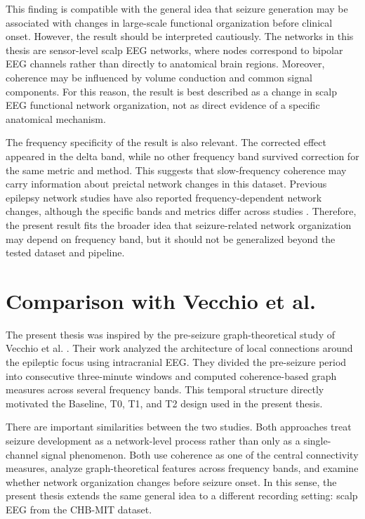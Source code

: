 This finding is compatible with the general idea that seizure generation may be
associated with changes in large-scale functional organization before clinical
onset. However, the result should be interpreted cautiously. The networks in
this thesis are sensor-level scalp EEG networks, where nodes correspond to
bipolar EEG channels rather than directly to anatomical brain regions. Moreover,
coherence may be influenced by volume conduction and common signal components.
For this reason, the result is best described as a change in scalp EEG
functional network organization, not as direct evidence of a specific anatomical
mechanism.

The frequency specificity of the result is also relevant. The corrected effect
appeared in the delta band, while no other frequency band survived correction
for the same metric and method. This suggests that slow-frequency coherence may
carry information about preictal network changes in this dataset. Previous
epilepsy network studies have also reported frequency-dependent network changes,
although the specific bands and metrics differ across studies
\cite{Ponten2007,Vecchio2016,Lanzone2022}. Therefore, the present result fits
the broader idea that seizure-related network organization may depend on
frequency band, but it should not be generalized beyond the tested dataset and
pipeline.

\section{Comparison with Vecchio et al.}
\label{sec:discussion-comparison-vecchio}

The present thesis was inspired by the pre-seizure graph-theoretical study of
Vecchio et al. \cite{Vecchio2016}. Their work analyzed the architecture of
local connections around the epileptic focus using intracranial EEG. They
divided the pre-seizure period into consecutive three-minute windows and
computed coherence-based graph measures across several frequency bands. This
temporal structure directly motivated the Baseline, T0, T1, and T2 design used
in the present thesis.

There are important similarities between the two studies. Both approaches treat
seizure development as a network-level process rather than only as a
single-channel signal phenomenon. Both use coherence as one of the central
connectivity measures, analyze graph-theoretical features across frequency
bands, and examine whether network organization changes before seizure onset.
In this sense, the present thesis extends the same general idea to a different
recording setting: scalp EEG from the CHB-MIT dataset.

